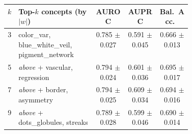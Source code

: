 \begin{tabular}{@{}rp{0.42\linewidth}ccc@{}}
\toprule
$k$ & Top-$k$ concepts (by $|w|$) & AUROC & AUPRC & Bal.\ Acc.\ \\
\midrule
3 & color\_var, blue\_white\_veil, pigment\_network       & 0.785 $\pm$ 0.027 & 0.591 $\pm$ 0.045 & 0.666 $\pm$ 0.013 \\
5 & \textit{above} + vascular, regression                  & 0.794 $\pm$ 0.024 & 0.601 $\pm$ 0.036 & 0.695 $\pm$ 0.017 \\
7 & \textit{above} + border, asymmetry                     & 0.794 $\pm$ 0.025 & 0.609 $\pm$ 0.034 & 0.694 $\pm$ 0.016 \\
9 & \textit{above} + dots\_globules, streaks               & 0.789 $\pm$ 0.028 & 0.599 $\pm$ 0.046 & 0.690 $\pm$ 0.014 \\
\bottomrule
\end{tabular}
